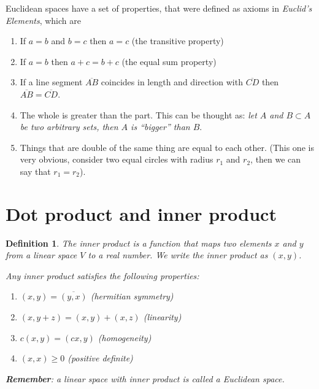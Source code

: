 \documentclass{book}
\newtheorem{definition}{Definition}[chapter]
\begin{document}
Euclidean spaces have a set of properties, that were defined as axioms in
\textit{Euclid's Elements}, which are
\begin{enumerate}
    \item If $a = b$ and $b = c$ then $a = c$ (the transitive property)
    \item If $a = b$ then $a + c = b + c$ (the equal sum property)
    \item If a line segment $\overline{AB}$ coincides in length and direction with
          $\overline{CD}$ then $\overline{AB} = \overline{CD}$.
    \item The whole is greater than the part. This can be thought as: \textit{let $A$ and
              $B\subset A$ be two arbitrary sets, then $A$ is ``bigger'' than $B$}.
    \item Things that are double of the same thing are equal to each other. (This one is
          very obvious, consider two equal circles with radius $r_1$ and $r_2$, then we
          can say that $r_1=r_2$).
\end{enumerate}

\section{Dot product and inner product}

\begin{definition}
    The \textit{inner product} is a function that maps two elements $x$ and $y$ from a linear space
    $V$ to a real number. We write the inner product as $\left(x,y\right)$.

    Any inner product satisfies the following properties:

    \begin{enumerate}
        \item $\left(x,y\right) = \overline{\left(y,x\right)}$ (hermitian symmetry)
        \item $\left(x,y+z\right) = \left(x,y\right) + \left(x,z\right)$ (linearity)
        \item $c\left(x,y\right) = \left(cx,y\right)$ (homogeneity)
        \item $\left(x,x\right) \geq 0$ (positive definite)
    \end{enumerate}

    \textbf{Remember}: a linear space with inner product is called a Euclidean space.
\end{definition}
\end{document}
